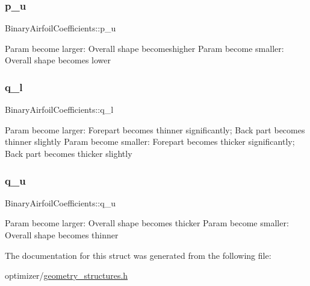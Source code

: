 \subsubsection{\texorpdfstring{p\+\_\+u}{p\_u}}
{\footnotesize\ttfamily Binary\+Airfoil\+Coefficients\+::p\+\_\+u}

Param become larger\+: Overall shape becomeshigher Param become smaller\+: Overall shape becomes lower \hypertarget{struct_binary_airfoil_coefficients_af015cf807e794441f030791862b22adb}{}\label{struct_binary_airfoil_coefficients_af015cf807e794441f030791862b22adb} 
\subsubsection{\texorpdfstring{q\+\_\+l}{q\_l}}
{\footnotesize\ttfamily Binary\+Airfoil\+Coefficients\+::q\+\_\+l}

Param become larger\+: Forepart becomes thinner significantly; Back part becomes thinner slightly Param become smaller\+: Forepart becomes thicker significantly; Back part becomes thicker slightly \hypertarget{struct_binary_airfoil_coefficients_a6ed8c98c3817a396756b2a16a0d4791b}{}\label{struct_binary_airfoil_coefficients_a6ed8c98c3817a396756b2a16a0d4791b} 
\subsubsection{\texorpdfstring{q\+\_\+u}{q\_u}}
{\footnotesize\ttfamily Binary\+Airfoil\+Coefficients\+::q\+\_\+u}

Param become larger\+: Overall shape becomes thicker Param become smaller\+: Overall shape becomes thinner 

The documentation for this struct was generated from the following file\+:\begin{DoxyCompactItemize}
\item 
optimizer/\hyperlink{geometry__structures_8h}{geometry\+\_\+structures.\+h}\end{DoxyCompactItemize}
